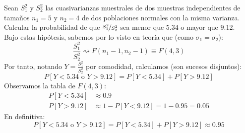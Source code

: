 \begin{ejercicio}
    Sean $S_1^2$ y $S_2^2$ las cuasivarianzas muestrales de dos muestras independientes de tamaños $n_1 = 5$ y $n_2 = 4$ de dos poblaciones normales con la misma varianza. Calcular la probabilidad de que $\nicefrac{S_1^2}{S_2^2}$ sea menor que $5.34$ o mayor que $9.12$.\\

    \noindent
    Bajo estas hipótesis, sabemos por lo visto en teoría que (como $\sigma_1=\sigma_2$):
    \begin{equation*}
        \dfrac{S_1^2}{S_2^2} \rightsquigarrow F(n_1-1, n_2-1) \equiv F(4,3)
    \end{equation*}
    Por tanto, notando $Y = \frac{S_1^2}{S_2^2}$ por comodidad, calculamos (son sucesos disjuntos):
    \begin{equation*}
        P[Y < 5.34 \text{\ o\ } Y>9.12] = P[Y<5.34] + P[Y>9.12]
    \end{equation*}
    Observamos la tabla de $F(4,3)$:
    \begin{align*}
        P[Y<5.34] &\approx 0.9 \\
        P[Y>9.12] &\approx 1-P[Y<9.12] = 1-0.95 = 0.05
    \end{align*}
    En definitiva:
    \begin{equation*}
        P[Y < 5.34 \text{\ o\ } Y>9.12] = P[Y<5.34] + P[Y>9.12] \approx 0.95
    \end{equation*}
\end{ejercicio}

